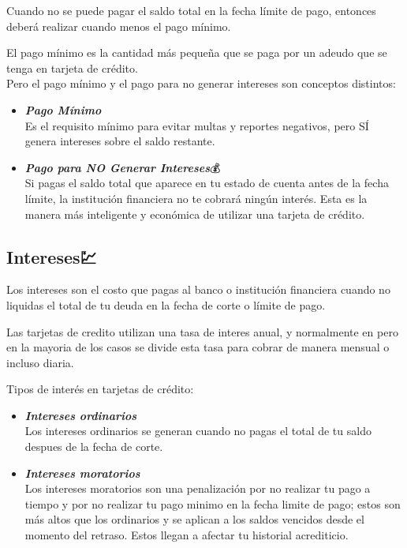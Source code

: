 \documentclass[
  letterpaper,
  DIV=11,
  numbers=noendperiod]{scrartcl}
\begin{document}
Cuando no se puede pagar el saldo total en la fecha límite de pago,
entonces deberá realizar cuando menos el pago mínimo.

El pago mínimo es la cantidad más pequeña que se paga por un adeudo que
se tenga en tarjeta de crédito.\\
Pero el pago mínimo y el pago para no generar intereses son conceptos
distintos:

\begin{itemize}
\item
  \textbf{\emph{Pago Mínimo}}💸\\
  Es el requisito mínimo para evitar multas y reportes negativos, pero
  SÍ genera intereses sobre el saldo restante.
\item
  \textbf{\emph{Pago para NO Generar Intereses}}💰\\
  Si pagas el saldo total que aparece en tu estado de cuenta antes de la
  fecha límite, la institución financiera no te cobrará ningún interés.
  Esta es la manera más inteligente y económica de utilizar una tarjeta
  de crédito.
\end{itemize}

\subsection{Intereses💹}\label{intereses}

Los intereses son el costo que pagas al banco o institución financiera
cuando no liquidas el total de tu deuda en la fecha de corte o límite de
pago.

Las tarjetas de credito utilizan una tasa de interes anual, y
normalmente en pero en la mayoria de los casos se divide esta tasa para
cobrar de manera mensual o incluso diaria.

Tipos de interés en tarjetas de crédito:

\begin{itemize}
\item
  \textbf{\emph{Intereses ordinarios}}\\
  Los intereses ordinarios se generan cuando no pagas el total de tu
  saldo despues de la fecha de corte.
\item
  \textbf{\emph{Intereses moratorios}}\\
  Los intereses moratorios son una penalización por no realizar tu pago
  a tiempo y por no realizar tu pago minimo en la fecha limite de pago;
  estos son más altos que los ordinarios y se aplican a los saldos
  vencidos desde el momento del retraso. Estos llegan a afectar tu
  historial acrediticio.
\end{itemize}
\end{document}

